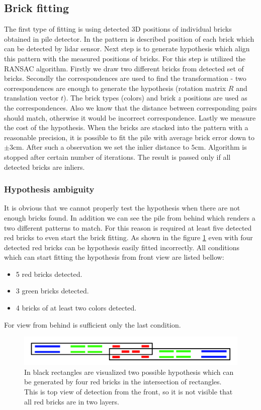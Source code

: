 \subsection{Brick fitting}
The first type of fitting is using detected 3D positions of individual bricks obtained in pile detector. In the pattern is described position of each brick which can be detected by lidar sensor. Next step is to generate hypothesis which align this pattern with the measured positions of bricks. For this step is utilized the RANSAC algorithm. Firstly we draw two different bricks from detected set of bricks. Secondly the correspondences are used to find the transformation - two correspondences are enough to generate the hypothesis (rotation matrix $R$ and translation vector $t$). The brick types (colors) and brick $z$ positions are used as the correspondences. Also we know that the distance between corresponding pairs should match, otherwise it would be incorrect correspondence. Lastly we measure the cost of the hypothesis. When the bricks are stacked into the pattern with a reasonable precision, it is possible to fit the pile with average brick error down to $\pm 3$cm. After such a observation we set the inlier distance to $5$cm. Algorithm is stopped after certain number of iterations. The result is passed only if all detected bricks are inliers.

\subsubsection{Hypothesis ambiguity}
It is obvious that we cannot properly test the hypothesis when there are not enough bricks found. In addition we can see the pile from behind which renders a two different patterns to match. For this reason is required at least five detected red bricks to even start the brick fitting. As shown in the figure \ref{fig:ambiguity} even with four detected red bricks can be hypothesis easily fitted incorrectly. All conditions which can start fitting the hypothesis from front view are listed bellow:
\begin{itemize}
\item 5 red bricks detected.
\item 3 green bricks detected.
\item 4 bricks of at least two colors detected.
\end{itemize}
For view from behind is sufficient only the last condition.
\begin{figure}[H]
\centering
\includegraphics[scale=0.3]{fig/ambiguous.png}
\caption[Hypothesis ambiguity]{In black rectangles are visualized two possible hypothesis which can be generated by four red bricks in the intersection of rectangles. This is top view of detection from the front, so it is not visible that all red bricks are in two layers.}
\label{fig:ambiguity}
\end{figure}

